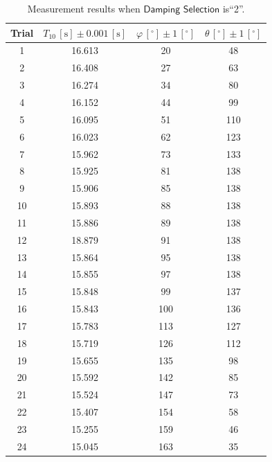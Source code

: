 \documentclass[a4paper]{article}
\begin{document}
\begin{table}[htbp]
\centering
\begin{tabular}{cccc}
\toprule
Trial & $T_{10}\,[\text{s}]\pm0.001\,[\text{s}]$ & $\varphi\,[^\circ]\pm1\,[^\circ]$ & $\theta\,[^\circ]\pm 1\,[^\circ]$\\
\midrule
1 &16.613&	20&	48\\
2 &16.408&	27&	63\\
3 &16.274&	34&	80\\
4 &16.152&	44&	99\\
5 &16.095&	51&	110\\
6 &16.023&	62&	123\\
7 &15.962&	73&	133\\
8 &15.925&	81&	138\\
9 &15.906&	85&	138\\
10 &15.893&	88&	138\\
11 &15.886&	89&	138\\
12 &18.879&	91&	138\\
13 &15.864&	95&	138\\
14 &15.855&	97&	138\\
15 &15.848&	99&	137\\
16 &15.843&	100&	136\\
17 &15.783&	113&	127\\
18 &15.719&	126&	112\\
19 &15.655&	135&	98\\
20 &15.592&	142&	85\\
21 &15.524&	147&	73\\
22 &15.407&	154&	58\\
23 &15.255&	159&46\\
24 &15.045&	163&	35\\
\bottomrule
\end{tabular}
\caption{Measurement results when $\textsf{Damping Selection}$ is``2''.\label{Tab:pregraphdamping2}}
\end{table}
\end{document}
